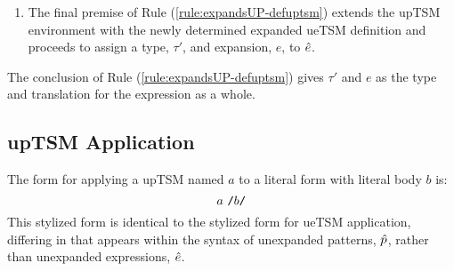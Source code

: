 {{{{\begin{enumerate}
upTSM environments are finite mappings from TSM names, $a$, to \emph{expanded upTSM definitions}, $\xuptsmdef{\tau}{\ueparse}$, where $\tau$ is the upTSM's type annotation and $\eparse$ is the upTSM's expanded parse function. The \emph{upTSM environment formation judgement}, $\uptsmenv{\Delta}{\Phi}$, ensures that the type annotations in $\Phi$ are well-formed assuming $\Delta$ and the parse functions in $\Phi$ are closed and of type $\aparr{\tBody}{\tParseResultPat}$.
\[\begin{array}{ll}
\textbf{Judgement Form} & \textbf{Description}\\
\uptsmenv{\Delta}{\Phi} & \text{upTSM environment $\Phi$ is well-formed assuming $\Delta$}\end{array}\]
This judgement is inductively defined by the following rules:
\begin{subequations}\label{rules:uptsmenv-U}
\begin{equation}\label{rule:uptsmenv-empty}
\inferrule{ }{\uptsmenv{\Delta}{\emptyset}}
\end{equation}
\begin{equation}\label{rule:uptsmenv-ext}
\inferrule{
  \uptsmenv{\Delta}{\Phi}\\
  \istypeU{\Delta}{\tau}\\
  \hastypeU{\emptyset}{\emptyset}{\eparse}{\aparr{\tBody}{\tParseResultPat}}
}{
  \uptsmenv{\Delta}{\Sigma, \xuptsmbnd{a}{\tau}{\eparse}}
}
\end{equation}
\end{subequations}

\item 
The final premise of Rule (\ref{rule:expandsUP-defuptsm}) extends the upTSM environment with the newly determined expanded ueTSM definition and proceeds to assign a type, $\tau'$, and expansion, $e$, to $\hat{e}$.
\end{enumerate}
The conclusion of Rule (\ref{rule:expandsUP-defuptsm}) gives $\tau'$ and $e$ as the type and translation for the expression as a whole.
\subsection{upTSM Application}
The form for applying a upTSM named $a$ to a literal form with literal body $b$ is:
\[
a~\texttt{/}b\texttt{/}
\] 
This stylized form is identical to the stylized form for ueTSM application, differing in that appears within the syntax of unexpanded patterns, $\hat{p}$, rather than unexpanded expressions, $\hat{e}$. %

}}}}
